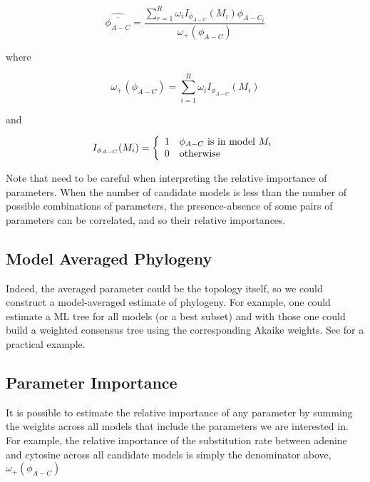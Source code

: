 \[
\widehat{\overline{\phi_{A-C}}} = \frac{\sum_{r=1}^R \omega_i I_{\phi_{A-C}}(M_i) \phi_{A-C_i}}{\omega_+(\phi_{A-C})}
\]

where

\[
\omega_+(\phi_{A-C}) = \sum_{i=1}^R \omega_i I_{\phi_{A-C}}(M_i)
\]

and

\[
I_{\phi_{A-C}}(M_i) = \left\{
\begin{array}{c l}
1 &  \mbox{$\phi_{A-C}$ is in model $M_i$}\\
0 & \mbox{otherwise}
\end{array}
\right.
\]

Note that need to be careful when interpreting the relative importance of parameters.
When the number of candidate models is less than the number of possible combinations of parameters,
the presence-absence of some pairs of parameters can be correlated, and so their relative importances.

\subsection{Model Averaged Phylogeny}
\label{sec:consensus}

Indeed, the averaged parameter could be the topology itself, so we could construct
a model-averaged estimate of phylogeny. For example, one could estimate a ML tree
for all models (or a best subset) and with those one could build a weighted consensus
tree using the corresponding Akaike weights. See \citet{Posada-2004} for a practical example.

\subsection{Parameter Importance}
\label{sec:param-importances}

It is possible to estimate the relative importance of any parameter by summing
the weights across all models that include the parameters we are interested in.
For example, the relative importance of the substitution rate between
adenine and cytosine across all candidate models is simply the denominator above,
$\omega_+(\phi_{A-C})$
